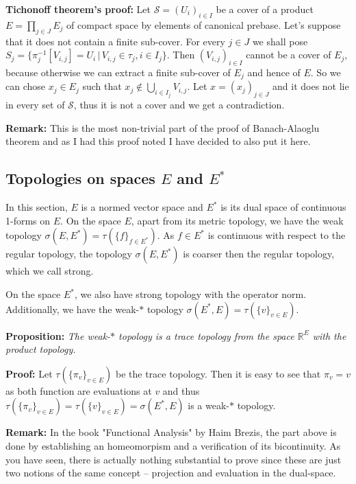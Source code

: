\documentclass{article}
\begin{document}
\textbf{Tichonoff theorem's proof:} Let $\mathcal{S}=(U_i)_{i\in I}$ be a cover of a
product $E=\prod_{j\in J} E_j$ of compact space by elements of canonical prebase.
Let's suppose that it does not contain a finite sub-cover. For every $j\in J$
we shall pose $S_j=\{\pi_j^{-1}[V_{i,j}]=U_i\,|\,V_{i,j}\in\tau_j,i\in I_j\}$.
Then $(V_{i,j})_{i\in I}$ cannot be a cover of $E_j$, because otherwise we can
extract a finite sub-cover of $E_j$ and hence of $E$. So we can chose $x_j\in
E_j$ such that $x_j\notin\bigcup_{i\in I_j}V_{i,j}$. Let $x=(x_j)_{j\in J}$ and
it does not lie in every set of $\mathcal{S}$, thus it is not a cover and we get
a contradiction.

\vspace{1ex}
\textbf{Remark:} This is the most non-trivial part of the proof of Banach-Alaoglu
theorem and as I had this proof noted I have decided to also put it here.

\subsection{Topologies on spaces $E$ and $E^*$}
In this section, $E$ is a normed vector space and $E^*$ is its dual space of continuous
1-forms on $E$. On the space $E$, apart from its metric topology, we have
the weak topology $\sigma(E, E^*)=\tau(\{f\}_{f\in E^*})$. As $f\in E^*$ is
continuous with respect to the regular topology, the topology $\sigma(E, E^*)$
is coarser then the regular topology, which we call strong.
\vspace{1ex}

On the space $E^*$, we also have strong topology with the operator norm.
Additionally, we have the weak-$*$ topology $\sigma(E^*, E)=\tau(\{v\}_{v\in E})$.

\vspace{1ex}
\textbf{Proposition:} \textit{The weak-$*$ topology is a trace topology from the space
$\mathbb{R}^E$ with the product topology.}

\vspace{1ex}
\textbf{Proof:} Let $\tau(\{\pi_v\}_{v\in E})$ be the trace topology. Then it
is easy to see that $\pi_v=v$ as both function are evaluations at $v$ and thus
$\tau(\{\pi_v\}_{v\in E})=\tau(\{v\}_{v\in E})=\sigma(E^*, E)$ is a weak-$*$
topology.

\vspace{1ex}
\textbf{Remark:} In the book "Functional Analysis" by Haim Brezis, the part
above is done by establishing an homeomorpism and a verification of its bicontinuity.
As you have seen, there is actually nothing substantial to prove since these are 
just two notions of the same concept – projection and evaluation in the dual-space.
\end{document}
